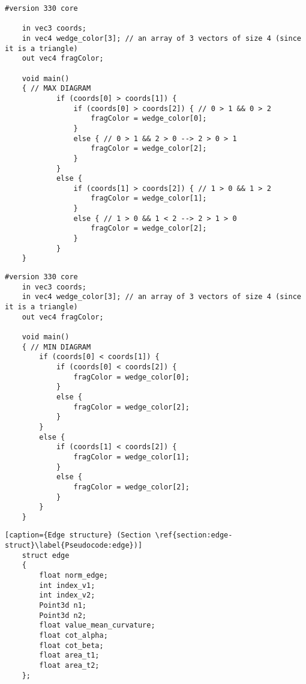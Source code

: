 \begin{lstlisting}[caption={Fragment Shader using max diagram - Vertex area (Section: \ref{section:max-diagram})\label{appendix:max-diagram}}]
    #version 330 core

    in vec3 coords;
    in vec4 wedge_color[3]; // an array of 3 vectors of size 4 (since it is a triangle)
    out vec4 fragColor;

    void main()
    { // MAX DIAGRAM
            if (coords[0] > coords[1]) {
                if (coords[0] > coords[2]) { // 0 > 1 && 0 > 2
                    fragColor = wedge_color[0];
                }
                else { // 0 > 1 && 2 > 0 --> 2 > 0 > 1
                    fragColor = wedge_color[2];
                }
            }
            else {
                if (coords[1] > coords[2]) { // 1 > 0 && 1 > 2
                    fragColor = wedge_color[1];
                }
                else { // 1 > 0 && 1 < 2 --> 2 > 1 > 0
                    fragColor = wedge_color[2];
                }
            }
    }
\end{lstlisting}

\vspace{10pt}

\begin{lstlisting}[caption={Fragment Shader using min diagram - Edge area (Section: \ref{section:min-diagram})\label{appendix:min-diagram}}]
    #version 330 core
    in vec3 coords;
    in vec4 wedge_color[3]; // an array of 3 vectors of size 4 (since it is a triangle)
    out vec4 fragColor;

    void main()
    { // MIN DIAGRAM
        if (coords[0] < coords[1]) {
            if (coords[0] < coords[2]) {
                fragColor = wedge_color[0];
            }
            else {
                fragColor = wedge_color[2];
            }
        }
        else {
            if (coords[1] < coords[2]) {
                fragColor = wedge_color[1];
            }
            else {
                fragColor = wedge_color[2];
            }
        }
    }
\end{lstlisting} \label{appendix:fragment-shader-min}
\vspace{10pt}

\begin{lstlisting}[caption={Edge structure} (Section \ref{section:edge-struct}\label{Pseudocode:edge})]
    struct edge
    {
        float norm_edge;
        int index_v1;
        int index_v2;
        Point3d n1;
        Point3d n2;
        float value_mean_curvature;
        float cot_alpha;
        float cot_beta;
        float area_t1;
        float area_t2;
    };
\end{lstlisting}

